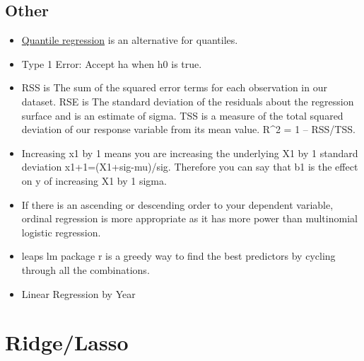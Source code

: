 \documentclass[]{book}
\newenvironment{Shaded}{\begin{snugshade}}{\end{snugshade}}
\newcommand{\KeywordTok}[1]{\textcolor[rgb]{0.13,0.29,0.53}{\textbf{#1}}}
\newcommand{\DataTypeTok}[1]{\textcolor[rgb]{0.13,0.29,0.53}{#1}}
\newcommand{\StringTok}[1]{\textcolor[rgb]{0.31,0.60,0.02}{#1}}
\newcommand{\OperatorTok}[1]{\textcolor[rgb]{0.81,0.36,0.00}{\textbf{#1}}}
\newcommand{\NormalTok}[1]{#1}
\theoremstyle{definition}
\theoremstyle{definition}
\theoremstyle{definition}
\theoremstyle{remark}
\begin{document}
\subsection{Other}\label{other}

\begin{itemize}
\item
  \href{https://en.wikipedia.org/wiki/Quantile_regression}{Quantile
  regression} is an alternative for quantiles.
\item
  Type 1 Error: Accept ha when h0 is true.
\item
  RSS is The sum of the squared error terms for each observation in our
  dataset. RSE is The standard deviation of the residuals about the
  regression surface and is an estimate of sigma. TSS is a measure of
  the total squared deviation of our response variable from its mean
  value. R\^{}2 = 1 -- RSS/TSS.
\item
  Increasing x1 by 1 means you are increasing the underlying X1 by 1
  standard deviation x1+1=(X1+sig-mu)/sig. Therefore you can say that b1
  is the effect on y of increasing X1 by 1 sigma.
\item
  If there is an ascending or descending order to your dependent
  variable, ordinal regression is more appropriate as it has more power
  than multinomial logistic regression.
\item
  leaps lm package r is a greedy way to find the best predictors by
  cycling through all the combinations.
\item
  Linear Regression by Year
\end{itemize}

\begin{Shaded}
\end{Shaded}

\section{Ridge/Lasso}\label{ridgelasso}
\end{document}
